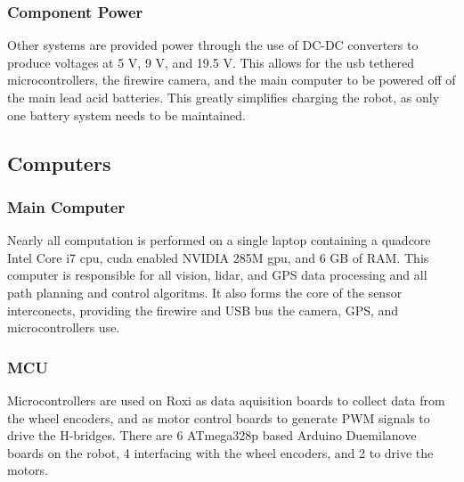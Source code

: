 \subsubsection{Component Power}

Other systems are provided power through the use of DC-DC converters to produce voltages at 5 V, 9 V, and 19.5 V. This allows for the usb tethered microcontrollers, the firewire camera, and the main computer to be powered off of the main lead acid batteries. This greatly simplifies charging the robot, as only one battery system needs to be maintained.

\subsection{Computers}

\subsubsection{Main Computer}

Nearly all computation is performed on a single laptop containing a quadcore Intel Core i7 cpu, cuda enabled NVIDIA 285M gpu, and 6 GB of RAM. This computer is responsible for all vision, lidar, and GPS data processing and all path planning and control algoritms. It also forms the core of the sensor interconects, providing the firewire and USB bus the camera, GPS, and microcontrollers use.

\subsubsection{MCU}

Microcontrollers are used on Roxi as data aquisition boards to collect data from the wheel encoders, and as motor control boards to generate PWM signals to drive the H-bridges. There are 6 ATmega328p based Arduino Duemilanove boards on the robot, 4 interfacing with the wheel encoders, and 2 to drive the motors.
